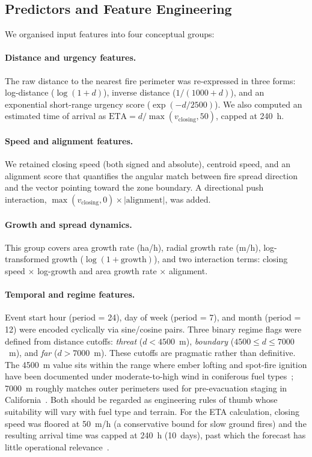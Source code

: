 \documentclass[fire,article,submit,pdftex]{../Definitions/mdpi}
\begin{document}
\subsection{Predictors and Feature Engineering}\label{sec:features}

We organised input features into four conceptual groups:

\paragraph{Distance and urgency features.}
The raw distance to the nearest fire perimeter was re-expressed in three forms: log-distance ($\log(1 + d)$), inverse distance ($1 / (1000 + d)$), and an exponential short-range urgency score ($\exp(-d / 2500)$).
We also computed an estimated time of arrival as $\text{ETA} = d / \max(v_{\mathrm{closing}}, 50)$, capped at 240~h.

\paragraph{Speed and alignment features.}
We retained closing speed (both signed and absolute), centroid speed, and an alignment score that quantifies the angular match between fire spread direction and the vector pointing toward the zone boundary.
A directional push interaction, $\max(v_{\mathrm{closing}}, 0) \times |\text{alignment}|$, was added.

\paragraph{Growth and spread dynamics.}
This group covers area growth rate (ha/h), radial growth rate (m/h), log-transformed growth ($\log(1 + \text{growth})$), and two interaction terms: closing speed $\times$ log-growth and area growth rate $\times$ alignment.

\paragraph{Temporal and regime features.}
Event start hour (period = 24), day of week (period = 7), and month (period = 12) were encoded cyclically via sine/cosine pairs.
Three binary regime flags were defined from distance cutoffs: \emph{threat} ($d < 4500$~m), \emph{boundary} ($4500 \leq d \leq 7000$~m), and \emph{far} ($d > 7000$~m).
These cutoffs are pragmatic rather than definitive. The 4500~m value sits within the range where ember lofting and spot-fire ignition have been documented under moderate-to-high wind in coniferous fuel types~\cite{Cruz2003,Finney2001}; 7000~m roughly matches outer perimeters used for pre-evacuation staging in California~\cite{Dolan2022}. Both should be regarded as engineering rules of thumb whose suitability will vary with fuel type and terrain.
For the ETA calculation, closing speed was floored at 50~m/h (a conservative bound for slow ground fires) and the resulting arrival time was capped at 240~h (10~days), past which the forecast has little operational relevance~\cite{Taylor2013}.
\end{document}
